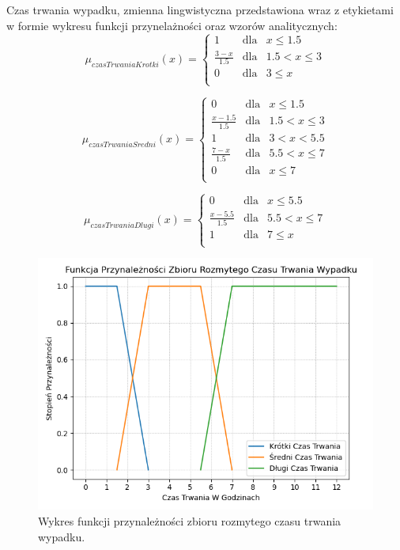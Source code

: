 \documentclass{classrep}
\begin{document}
Czas trwania wypadku, zmienna lingwistyczna przedstawiona wraz z etykietami w formie wykresu funkcji przynelażności oraz wzorów analitycznych:
\begin{equation}
\mu _{czasTrwaniaKrotki}(x) =  \left\{ \begin{array}{rcl}
 1 & \mbox{dla} & x  \leq 1.5 \\
\frac{3 - x}{1.5} & \mbox{dla} & 1.5 < x \leq 3\\
0 & \mbox{dla} & 3 \leq x\\
\end{array}\right.
\end{equation}

\begin{equation}
\mu _{czasTrwaniaSredni}(x) =  \left\{ \begin{array}{rcl}
 0 & \mbox{dla} & x  \leq 1.5 \\
\frac{x - 1.5}{1.5} & \mbox{dla} & 1.5 < x \leq 3\\
1 & \mbox{dla} & 3 < x < 5.5\\
\frac{7 - x}{1.5} & \mbox{dla} & 5.5 < x \leq 7\\
 0 & \mbox{dla} & x  \leq 7 \\
\end{array}\right.
\end{equation}

\begin{equation}
\mu _{czasTrwaniaDlugi}(x) =  \left\{ \begin{array}{rcl}
 0 & \mbox{dla} & x \leq 5.5 \\
\frac{x - 5.5}{1.5} & \mbox{dla} & 5.5 < x \leq 7\\
1 & \mbox{dla} & 7 \leq x\\
\end{array}\right.
\end{equation}

\begin{figure}[h!]
 \centering
 \includegraphics[width=14cm]{FunkcjaPrzynaleznosciCzasTrwania.png}
 \vspace{-0.3cm}
 \caption{Wykres funkcji przynależności zbioru rozmytego czasu trwania wypadku. }
 \label{rysunek do eksperymentu 1 wariantu 1}
\end{figure}
\newpage
\end{document}
